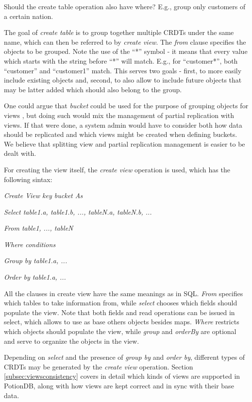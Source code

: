 \documentclass{vldb}
\newcommand{\grumbler}[2]{{\color{red}{\bf #1:} #2}}
\newcommand{\andre}[1]{\grumbler{andre}{#1}}
\newcommand{\emphvspace}{0.5\baselineskip}
\newcommand{\firstblockemph}[1]{\vspace{\emphvspace}\hspace{2em}\emph{#1}}
\newcommand{\middleblockemph}[1]{\hspace{2em}\emph{#1}}
\newcommand{\lastblockemph}[1]{\hspace{2em}\emph{#1}\vspace{\emphvspace}}
\begin{document}
\andre{Should the create table operation also have where? E.g., group only customers of a certain nation.}

The goal of \emph{create table} is to group together multiple CRDTs under the same name, which can then be referred to by \emph{create view}.
The \emph{from} clause specifies the objects to be grouped.
Note the use of the ``*'' symbol - it means that every value which starts with the string before ``*'' will match.
E.g., for ``customer*'', both ``customer'' and ``customer1'' match.
This serves two goals - first, to more easily include existing objects and, second, to also allow to include future objects that may be latter added which should also belong to the group.

One could argue that \emph{bucket} could be used for the purpose of grouping objects for views , but doing such would mix the management of partial replication with views.
If that were done, a system admin would have to consider both how data should be replicated and which views might be created when defining buckets.
We believe that splitting view and partial replication management is easier to be dealt with.

For creating the view itself, the \emph{create view} operation is used, which has the following sintax:

\firstblockemph{Create View key bucket As}

\middleblockemph{Select table1.a, table1.b, ..., tableN.a, tableN.b, ...}

\middleblockemph{From table1, ..., tableN}

\middleblockemph{Where conditions}

\middleblockemph{Group by table1.a, ...}

\lastblockemph{Order by table1.a, ...}

All the clauses in create view have the same meanings as in SQL.
\emph{From} specifies which tables to take information from, while \emph{select} chooses which fields should populate the view. 
Note that both fields and read operations can be issued in select, which allows to use as base others objects besides maps.
\emph{Where} restricts which objects should populate the view, while \emph{group} and \emph{orderBy} are optional and serve to organize the objects in the view.

Depending on \emph{select} and the presence of \emph{group by} and \emph{order by}, different types of CRDTs may be generated by the \emph{create view} operation.
Section \ref{subsec:viewsconsistency} covers in detail which kinds of views are supported in PotionDB, along with how views are kept correct and in sync with their base data.
\end{document}
